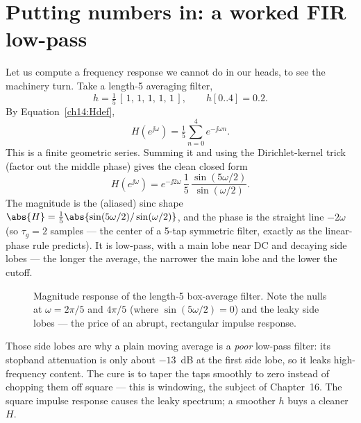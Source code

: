 \section{Putting numbers in: a worked FIR low-pass}
\label{ch14:firworked}

Let us compute a frequency response we cannot do in our heads, to see the
machinery turn. Take a length-5 averaging filter,
\[
  h = \tfrac15\,[\,1,\,1,\,1,\,1,\,1\,], \qquad h[0..4]=0.2.
\]
By Equation~\eqref{ch14:Hdef},
\[
  H(e^{\jj\omega}) = \tfrac15\sum_{n=0}^{4} e^{-\jj\omega n}.
\]
This is a finite geometric series. Summing it and using the Dirichlet-kernel
trick (factor out the middle phase) gives the clean closed form
\[
  H(e^{\jj\omega}) = e^{-\jj 2\omega}\,\frac{1}{5}\,
     \frac{\sin(5\omega/2)}{\sin(\omega/2)}.
\]
The magnitude is the (aliased) sinc shape
$\abs{H} = \tfrac15\abs{\sin(5\omega/2)/\sin(\omega/2)}$, and the phase is the
straight line $-2\omega$ (so $\tau_g = 2$ samples --- the center of a 5-tap
symmetric filter, exactly as the linear-phase rule predicts). It is low-pass,
with a main lobe near DC and decaying side lobes --- the longer the average, the
narrower the main lobe and the lower the cutoff.

\begin{figure}[H]
\centering
{}
\caption{Magnitude response of the length-5 box-average filter. Note the nulls
at $\omega = 2\pi/5$ and $4\pi/5$ (where $\sin(5\omega/2)=0$) and the leaky side
lobes --- the price of an abrupt, rectangular impulse response.}
\label{ch14:fig-box5}
\end{figure}

\begin{trapbox}
Those side lobes are why a plain moving average is a \emph{poor} low-pass filter:
its stopband attenuation is only about $-13$~dB at the first side lobe, so it
leaks high-frequency content. The cure is to taper the taps smoothly to zero
instead of chopping them off square --- this is windowing, the subject of
Chapter~16. The square impulse response causes the leaky spectrum; a smoother
$h$ buys a cleaner $H$.
\end{trapbox}

